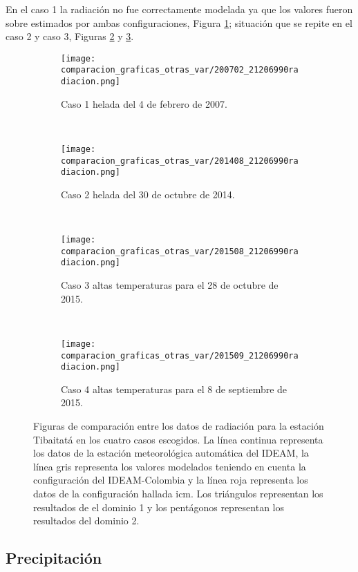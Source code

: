 En el caso 1 la radiación no fue correctamente modelada ya que los valores fueron sobre estimados por ambas configuraciones, Figura \ref{caso1_tiba_wrf_rad}; situación que se repite en el caso 2 y caso 3, Figuras \ref{caso2_tiba_wrf_rad} y \ref{caso3_tiba_wrf_rad}.\\

\begin{figure}[H]
    
\begin{subfigure}[normla]{0.4\textwidth}
\caption{Caso 1 helada del 4 de febrero de 2007.}
\label{caso1_tiba_wrf_rad}
\texttt{[image: comparacion\_graficas\_otras\_var/200702\_21206990radiacion.png]}
\end{subfigure}
~
\begin{subfigure}[normla]{0.4\textwidth}
\caption{Caso 2 helada del 30 de octubre de 2014.}
\label{caso2_tiba_wrf_rad}
\texttt{[image: comparacion\_graficas\_otras\_var/201408\_21206990radiacion.png]}
\end{subfigure}
~
\centering
\begin{subfigure}[normla]{0.4\textwidth}
\caption{Caso 3 altas temperaturas para el 28 de octubre de 2015.}
\label{caso3_tiba_wrf_rad}
\texttt{[image: comparacion\_graficas\_otras\_var/201508\_21206990radiacion.png]}
\end{subfigure}
~
\centering
\begin{subfigure}[normla]{0.4\textwidth}
\caption{Caso 4 altas temperaturas para el 8 de septiembre de 2015.}
\label{caso4_tiba_wrf_rad}
\texttt{[image: comparacion\_graficas\_otras\_var/201509\_21206990radiacion.png]}
\end{subfigure}

    \caption{Figuras de comparación entre los datos de radiación para la estación Tibaitatá en los cuatro casos escogidos. La línea continua representa los datos de la estación meteorológica automática del IDEAM, la línea gris representa los valores modelados teniendo en cuenta la configuración del IDEAM-Colombia y la línea roja representa los datos de la configuración hallada icm. Los triángulos representan los resultados de el dominio 1 y los pentágonos representan los resultados del dominio 2.}
    \label{fig:wrf_rad_tibaitata}
\end{figure}


\subsection{Precipitación}

